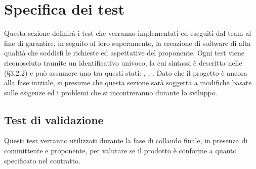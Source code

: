 \pagebreak
\section{Specifica dei test}
Questa sezione definirà i test che verranno implementati ed eseguiti dal team al fine di garantire, in seguito al loro superamento, la creazione di software di alta qualità che soddisfi le richieste ed aspettative del proponente. 
Ogni test viene riconosciuto tramite un identificativo univoco, la cui sintassi è descritta nelle \NdP (§3.2.2) e può assumere uno tra questi stati: \Tni, \Ti, \Ts. 
Dato che il progetto è ancora alla fase iniziale, si presume che questa sezione sarà soggetta a modifiche basate sulle esigenze ed i problemi che si incontreranno durante lo sviluppo.

\subsection{Test di validazione}
Questi test verranno utilizzati durante la fase di collaudo finale, in presenza di committente e proponente, per valutare se il prodotto è conforme a quanto specificato nel contratto.

